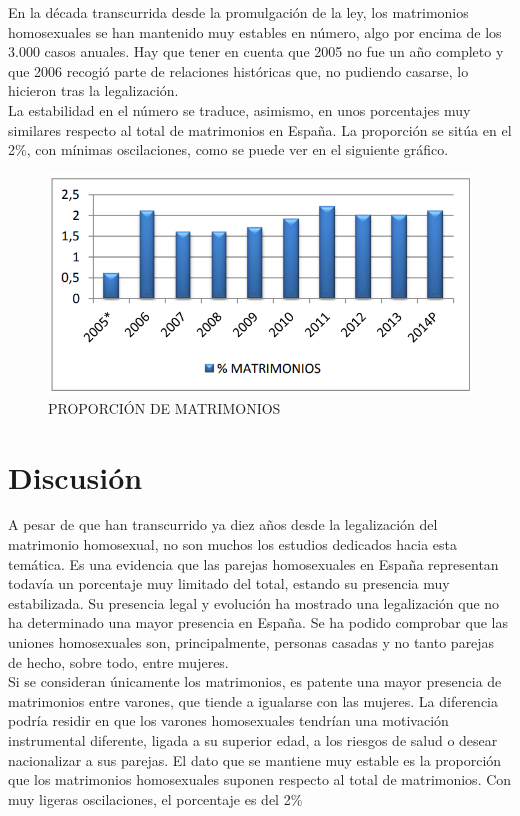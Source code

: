 \documentclass{article}
\begin{document}
En la década transcurrida desde la promulgación de la ley, los matrimonios homosexuales se han mantenido muy estables en número, algo por encima de los 3.000 casos anuales. Hay que tener en cuenta que 2005 no fue un año completo y que 2006 recogió parte de relaciones históricas que, no pudiendo casarse, lo hicieron tras la legalización. \\

La estabilidad en el número se traduce, asimismo, en unos porcentajes muy similares respecto al total de matrimonios en España. La proporción se sitúa en el 2\%, con mínimas oscilaciones, como se puede ver en el siguiente gráfico.
\begin{figure}[!hbp]

\includegraphics[scale=0.7]{grafico1.png} \caption{PROPORCIÓN DE MATRIMONIOS}
\label{fig:1}
\end{figure}
\section{Discusión}
A pesar de que han transcurrido ya diez años desde la legalización del matrimonio
homosexual, no son muchos los estudios dedicados hacia esta temática. Es una
evidencia que las parejas homosexuales en España representan todavía un porcentaje
muy limitado del total, estando su presencia muy estabilizada\cite{goldberg2013same}. Su presencia legal y
evolución ha mostrado una legalización que no ha determinado una mayor presencia en
España. Se ha podido comprobar que las uniones homosexuales son, principalmente,
personas casadas y no tanto parejas de hecho, sobre todo, entre mujeres\cite{diez2015sistema}.\\ 

Si se consideran únicamente los matrimonios, es patente una mayor presencia de
matrimonios entre varones, que tiende a igualarse con las mujeres\cite{trilla2010uniones}. La diferencia podría
residir en que los varones homosexuales tendrían una motivación instrumental diferente,
ligada a su superior edad, a los riesgos de salud o desear nacionalizar a sus parejas. El
dato que se mantiene muy estable es la proporción que los matrimonios homosexuales
suponen respecto al total de matrimonios\cite{andersson2006demographics}. Con muy ligeras oscilaciones, el porcentaje es
del 2\%\\
\end{document}
